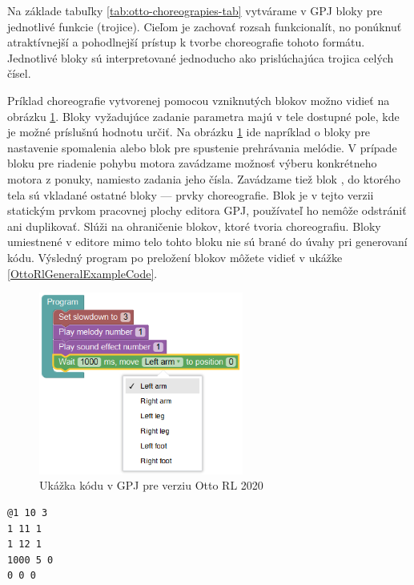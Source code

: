 Na základe tabuľky \ref{tab:otto-choreograpies-tab} vytvárame v GPJ bloky pre jednotlivé funkcie (trojice). Cieľom je zachovať rozsah funkcionalít, no ponúknuť atraktívnejší a pohodlnejší prístup k tvorbe choreografie tohoto formátu. Jednotlivé bloky sú interpretované jednoducho ako prislúchajúca trojica celých čísel.

Príklad choreografie vytvorenej pomocou vzniknutých blokov možno vidieť na obrázku \ref{obr:otto-rl-blockly-general-example}. Bloky vyžadujúce zadanie parametra majú v tele dostupné pole, kde je možné príslušnú hodnotu určiť. Na obrázku \ref{obr:otto-rl-blockly-general-example} ide napríklad o bloky pre nastavenie spomalenia alebo blok pre spustenie prehrávania melódie. V prípade bloku pre riadenie pohybu motora zavádzame možnosť výberu konkrétneho motora z ponuky, namiesto zadania jeho čísla. Zavádzame tiež blok , do ktorého tela sú vkladané ostatné bloky --- prvky choreografie. Blok  je v tejto verzii statickým prvkom pracovnej plochy editora GPJ, používateľ ho nemôže odstrániť ani duplikovať. Slúži na ohraničenie blokov, ktoré tvoria choreografiu. Bloky umiestnené v editore mimo telo tohto bloku nie sú brané do úvahy pri generovaní kódu. Výsledný program po preložení blokov môžete vidieť v ukážke \ref{OttoRlGeneralExampleCode}.

\begin{figure}
\centerline{\includegraphics[width=0.6\textwidth]{images/otto-rl-blockly-general}}
\caption[Ukážka kódu v GPJ pre verziu Otto RL 2020]{Ukážka kódu v GPJ pre verziu Otto RL 2020}
\label{obr:otto-rl-blockly-general-example}
\end{figure}

\begin{lstlisting}[frame=single]
@1 10 3
1 11 1
1 12 1
1000 5 0
0 0 0
\end{lstlisting}


